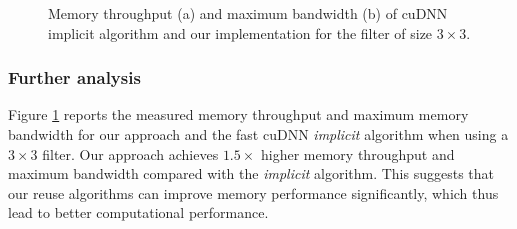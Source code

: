 \begin{figure}[t!]
\centering

 \hspace{0em}


	
\caption{Memory throughput (a) and maximum bandwidth (b) of cuDNN implicit algorithm and our implementation for the filter of size $3 \times 3$.}
\label{fig:depwisememanaly}
\vspace{-2mm}
\end{figure}

\subsubsection{Further analysis}
Figure \ref{fig:depwisememanaly} reports the measured memory throughput and maximum memory bandwidth for our approach and the fast cuDNN
\emph{implicit} algorithm when using a $3 \times 3$ filter. Our approach achieves $1.5 \times$ higher memory throughput and maximum
bandwidth compared with the \emph{implicit} algorithm. This suggests that our reuse algorithms can improve memory performance significantly, which
thus lead to better computational performance.


